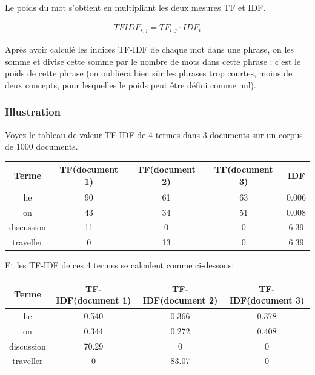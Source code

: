 \documentclass[a4paper, 12pt]{article}
\begin{document}
\begin{definition}[TF-IDF]
Le poids du mot s'obtient en multipliant les deux mesures TF et IDF.
\end{definition}

\begin{align}
 TFIDF_{i,j} = TF_{i,j} \cdot  IDF_{i}
\end{align}

\begin{definition}
Après avoir calculé les indices TF-IDF de chaque mot dans une phrase, on les somme et divise cette somme par le nombre de mots dans cette phrase : c'est le poids de cette phrase (on oubliera bien sûr les phrases trop courtes, moins de deux concepts, pour lesquelles le poids peut être défini comme nul).
\end{definition}

\subsubsection{Illustration}
Voyez le tableau de valeur TF-IDF de 4 termes dans 3 documents sur un corpus de 1000 documents.
\begin{center}
	\begin{tabular}{|c|c|c|c|c|}
	 \hline
	 	Terme & TF(document 1) & TF(document 2) & TF(document 3) & IDF \\
	 \hline
	 	he & 90 & 61 & 63 & 0.006 \\
	 \hline
	 	on & 43 & 34 & 51 & 0.008 \\
	 \hline
	 	discussion & 11 & 0 & 0 & 6.39 \\
	 \hline
	 	traveller & 0 & 13 & 0 & 6.39 \\
	 \hline
	\end{tabular}
\end{center}

Et les TF-IDF de ces 4 termes se calculent comme ci-dessous:

\begin{center}
	\begin{tabular}{|c|c|c|c|}
	 \hline
	 	Terme & TF-IDF(document 1) & TF-IDF(document 2) & TF-IDF(document 3) \\
	 \hline
	 	he & 0.540 & 0.366 & 0.378 \\
	 \hline
	 	on & 0.344 & 0.272 & 0.408 \\
	 \hline
	 	discussion & 70.29 & 0 & 0 \\
	 \hline
	 	traveller & 0 & 83.07 & 0 \\
	 \hline
	\end{tabular}
\end{center}
\end{document}
